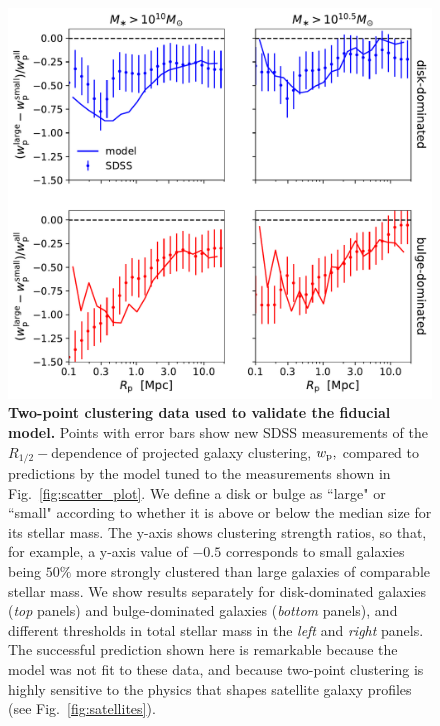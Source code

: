 \documentclass[usenatbib,usegraphicx,letterpaper]{mn2e}
\newcommand{\rhalf}{R_{1/2}}
\newcommand{\wproj}{w_{\rm p}}
\begin{document}
\begin{figure}
\centering
\includegraphics[width=12cm]{FIGS/size_clustering_ratios_bt_decomposition_model_vs_sdss.pdf}
\caption{
{\bf Two-point clustering data used to validate the fiducial model.}
Points with error bars show new SDSS measurements of the $\rhalf-$dependence of projected galaxy clustering, $\wproj,$ compared to predictions by the model tuned to the measurements shown in Fig.~\ref{fig:scatter_plot}. We define a disk or bulge as ``large" or ``small" according to whether it is above or below the median size for its stellar mass. The y-axis shows clustering strength ratios, so that, for example, a y-axis value of $-0.5$ corresponds to small galaxies being $50\%$ more strongly clustered than large galaxies of comparable stellar mass. We show results separately for disk-dominated galaxies ({\em top} panels) and bulge-dominated galaxies ({\em bottom }panels), and different thresholds in total stellar mass in the {\em left} and {\em right} panels. The successful prediction shown here is remarkable because the model was not fit to these data, and because two-point clustering is highly sensitive to the physics that shapes satellite galaxy profiles (see Fig.~\ref{fig:satellites}). 
}
\label{fig:clustering_ratio_upshot}
\end{figure}
\end{document}
